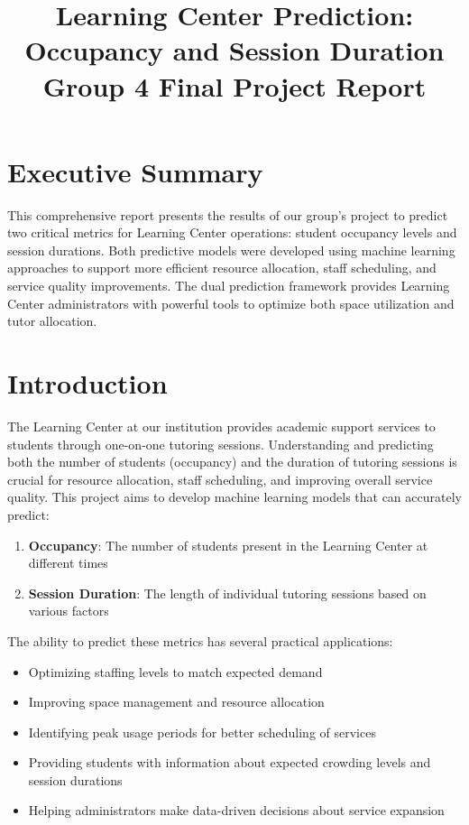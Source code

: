 \documentclass[12pt,letterpaper]{article}
\title{\LARGE \textbf{Learning Center Prediction: Occupancy and Session Duration\\Group 4 Final Project Report}}
\author{}
\date{}
\begin{document}
\maketitle

\section*{Executive Summary}

This comprehensive report presents the results of our group's project to predict two critical metrics for Learning Center operations: student occupancy levels and session durations. Both predictive models were developed using machine learning approaches to support more efficient resource allocation, staff scheduling, and service quality improvements. The dual prediction framework provides Learning Center administrators with powerful tools to optimize both space utilization and tutor allocation.

\tableofcontents
\newpage

\section{Introduction}

The Learning Center at our institution provides academic support services to students through one-on-one tutoring sessions. Understanding and predicting both the number of students (occupancy) and the duration of tutoring sessions is crucial for resource allocation, staff scheduling, and improving overall service quality. This project aims to develop machine learning models that can accurately predict:

\begin{enumerate}
    \item \textbf{Occupancy}: The number of students present in the Learning Center at different times
    \item \textbf{Session Duration}: The length of individual tutoring sessions based on various factors
\end{enumerate}

The ability to predict these metrics has several practical applications:
\begin{itemize}
    \item Optimizing staffing levels to match expected demand
    \item Improving space management and resource allocation
    \item Identifying peak usage periods for better scheduling of services
    \item Providing students with information about expected crowding levels and session durations
    \item Helping administrators make data-driven decisions about service expansion
\end{itemize}
\end{document}
